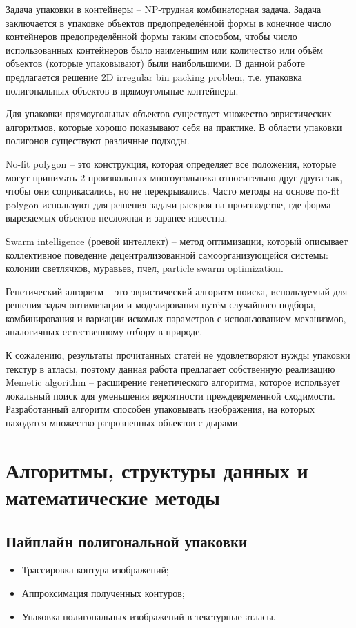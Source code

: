 \documentclass{fefu_thesis/cls/fefu}
\begin{document}
    Задача упаковки в контейнеры -- NP-трудная комбинаторная задача. Задача заключается в упаковке объектов предопределённой формы в конечное число контейнеров предопределённой формы таким способом, чтобы число использованных контейнеров было наименьшим или количество или объём объектов (которые упаковывают) были наибольшими. В данной работе предлагается решение 2D irregular bin packing problem, т.е. упаковка полигональных объектов в прямоугольные контейнеры.

    Для упаковки прямоугольных объектов существует множество эвристических алгоритмов\cite{ThousandWayToPackBin}, которые хорошо показывают себя на практике. В области упаковки полигонов существуют различные подходы.

    No-fit polygon\cite{NofitPolygon}\cite{NofitPolygon2} -- это конструкция, которая определяет все положения, которые могут принимать 2 произвольных многоугольника относительно друг друга так, чтобы они соприкасались, но не перекрывались. Часто методы на основе no-fit polygon используют для решения задачи раскроя на производстве, где форма вырезаемых объектов несложная и заранее известна.

    Swarm intelligence (роевой интеллект) -- метод оптимизации, который описывает коллективное поведение децентрализованной самоорганизующейся системы: колонии светлячков\cite{FireFly}, муравьев\cite{AntColony}, пчел\cite{PlayrixArticle}, particle swarm optimization\cite{PSO}.

    Генетический алгоритм\cite{JAKOBS1996165} -- это эвристический алгоритм поиска, используемый для решения задач оптимизации и моделирования путём случайного подбора, комбинирования и вариации искомых параметров с использованием механизмов, аналогичных естественному отбору в природе.

    К сожалению, результаты прочитанных статей не удовлетворяют нужды упаковки текстур в атласы, поэтому данная работа предлагает собственную реализацию Memetic algorithm -- расширение генетического алгоритма, которое использует локальный поиск для уменьшения вероятности преждевременной сходимости. Разработанный алгоритм способен упаковывать изображения, на которых находятся множество разрозненных объектов с дырами.

    \section{Алгоритмы, структуры данных и математические методы}
    \subsection{Пайплайн полигональной упаковки}
    \begin{itemize}
        \item Трассировка контура изображений;
        \item Аппроксимация полученных контуров;
        \item Упаковка полигональных изображений в текстурные атласы.
    \end{itemize}
\end{document}
